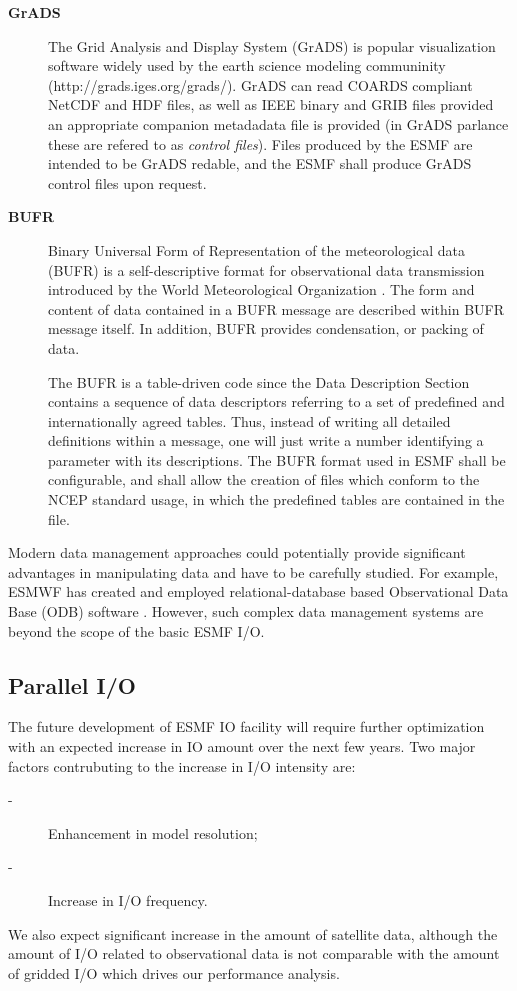 \begin{description}
\item[\bf GrADS] The Grid Analysis and Display System (GrADS) is popular 
visualization software widely used by the earth science modeling
communinity (http://grads.iges.org/grads/). GrADS can read COARDS
compliant NetCDF and HDF files, as well as IEEE binary and GRIB files
provided an appropriate companion metadadata file is provided (in
GrADS parlance these are refered to as {\em control files}). Files
produced by the ESMF are intended to be GrADS redable, and the ESMF
shall produce GrADS control files upon request.

\item[\bf BUFR] Binary Universal Form of Representation of the meteorological 
data (BUFR) is a self-descriptive format for observational data
transmission introduced by the World Meteorological Organization
\cite{WMO-BUFR-CREX}. The form and content of data contained in a BUFR 
message are described within BUFR message itself. In addition, BUFR provides 
condensation, or packing of data. 

The BUFR is a table-driven code since the Data Description Section
contains a sequence of data descriptors referring to a set of
predefined and internationally agreed tables. Thus, instead of writing
all detailed definitions within a message, one will just write a
number identifying a parameter with its descriptions. The BUFR format
used in ESMF shall be configurable, and shall allow the creation of
files which conform to the NCEP standard usage, in which the
predefined tables are contained in the file.

\end{description}

Modern data management approaches could potentially provide significant 
advantages in manipulating data and have to be carefully studied.
For example, ESMWF has created and employed relational-database based 
Observational Data Base (ODB) software \cite{ODB}.  However, such complex 
data management systems are beyond the scope of the basic ESMF I/O. 


\subsection{Parallel I/O}

The future development of ESMF IO facility will require further
optimization with an expected increase in IO amount over the next few
years. Two major factors contrubuting to the increase in I/O intensity are:
\begin{description}
\item[-] Enhancement in model resolution;
\item[-] Increase in I/O frequency.
\end{description}
We also expect significant increase in the amount of satellite data, although 
the amount of I/O related to observational data is not comparable with 
the amount of gridded I/O which drives our performance analysis. 


